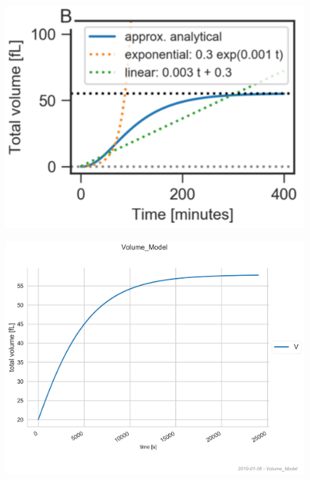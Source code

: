 \begin{figure}[htbp]
	
	\begin{minipage}{0,5\textwidth}
		
		\includegraphics[width=\textwidth]{picture/Volume_Paper.png}
		
		\label{volumePaper} 
	\end{minipage}
	\begin{minipage}{0,5\textwidth}
		
		\includegraphics[width=\textwidth]{picture/volume_examine.png}
		
		\label{volumeImplemented} 
	\end{minipage}
	\caption{}
\end{figure}


